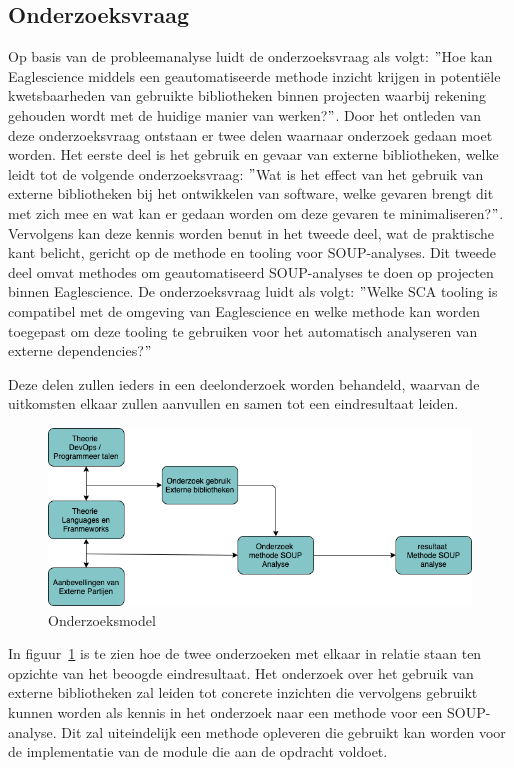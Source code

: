 \subsection{Onderzoeksvraag}\label{subsec:onderzoeksvraag-en-deelvragen}
Op basis van de probleemanalyse luidt de onderzoeksvraag als volgt: $"$Hoe kan Eaglescience middels een geautomatiseerde methode inzicht krijgen in potentiële kwetsbaarheden van gebruikte bibliotheken binnen projecten waarbij rekening gehouden wordt met de huidige manier van werken?$"$. Door het ontleden van deze onderzoeksvraag ontstaan er twee delen waarnaar onderzoek gedaan moet worden. Het eerste deel is het gebruik en gevaar van externe bibliotheken, welke leidt tot de volgende onderzoeksvraag: $"$Wat is het effect van het gebruik van externe bibliotheken bij het ontwikkelen van software, welke gevaren brengt dit met zich mee en wat kan er gedaan worden om deze gevaren te minimaliseren?$"$. Vervolgens kan deze kennis worden benut in het tweede deel, wat de praktische kant belicht, gericht op de methode en tooling voor SOUP-analyses. Dit tweede deel omvat methodes om geautomatiseerd SOUP-analyses te doen op projecten binnen Eaglescience. De onderzoeksvraag luidt als volgt: $"$Welke SCA tooling is compatibel met de omgeving van Eaglescience en welke methode kan worden toegepast om deze tooling te gebruiken voor het automatisch analyseren van externe dependencies?$"$

Deze delen zullen ieders in een deelonderzoek worden behandeld, waarvan de uitkomsten elkaar zullen aanvullen en samen tot een eindresultaat leiden.
\begin{figure}
    \myfloatalign
    \includegraphics[width=12cm]{gfx/Onderzoekmodel}
    \caption{Onderzoeksmodel}
    \label{fig:OnderzoeksModel}
\end{figure}

In figuur~\ref{fig:OnderzoeksModel} is te zien hoe de twee onderzoeken met elkaar in relatie staan ten opzichte van het beoogde eindresultaat. Het onderzoek over het gebruik van externe bibliotheken zal leiden tot concrete inzichten die vervolgens gebruikt kunnen worden als kennis in het onderzoek naar een methode voor een SOUP-analyse. Dit zal uiteindelijk een methode opleveren die gebruikt kan worden voor de implementatie van de module die aan de opdracht voldoet.

